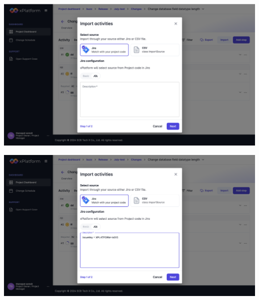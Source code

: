 \begin{center}
    \includegraphics[width=\linewidth]{resources/pages/change-runbook/import-jira/24.png}

    \vspace{1in}

    \includegraphics[width=\linewidth]{resources/pages/change-runbook/import-jira/25.png}
\end{center}
